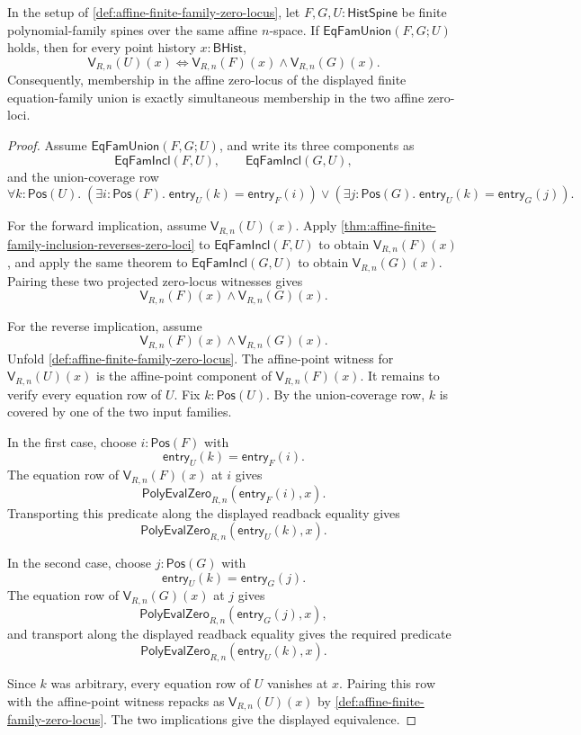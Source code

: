 \begin{theorem}
\label{thm:affine-zero-locus-union-is-intersection}
In the setup of \autoref{def:affine-finite-family-zero-locus}, let $F,G,U:\mathsf{HistSpine}$ be finite polynomial-family spines over the same affine $n$-space. If $\mathsf{EqFamUnion}(F,G;U)$ holds, then for every point history $x:\mathsf{BHist}$,
$$
\mathsf{V}_{R,n}(U)(x)
\Longleftrightarrow
\mathsf{V}_{R,n}(F)(x)\land\mathsf{V}_{R,n}(G)(x).
$$
Consequently, membership in the affine zero-locus of the displayed finite equation-family union is exactly simultaneous membership in the two affine zero-loci.
\end{theorem}
\begin{proof}
Assume $\mathsf{EqFamUnion}(F,G;U)$, and write its three components as
$$
\mathsf{EqFamIncl}(F,U),
\qquad
\mathsf{EqFamIncl}(G,U),
$$
and the union-coverage row
$$
\forall k:\mathsf{Pos}(U).\;
\left(\exists i:\mathsf{Pos}(F).\;
\mathsf{entry}_{U}(k)=\mathsf{entry}_{F}(i)\right)
\lor
\left(\exists j:\mathsf{Pos}(G).\;
\mathsf{entry}_{U}(k)=\mathsf{entry}_{G}(j)\right).
$$

For the forward implication, assume $\mathsf{V}_{R,n}(U)(x)$. Apply \autoref{thm:affine-finite-family-inclusion-reverses-zero-loci} to $\mathsf{EqFamIncl}(F,U)$ to obtain $\mathsf{V}_{R,n}(F)(x)$, and apply the same theorem to $\mathsf{EqFamIncl}(G,U)$ to obtain $\mathsf{V}_{R,n}(G)(x)$. Pairing these two projected zero-locus witnesses gives
$$
\mathsf{V}_{R,n}(F)(x)\land\mathsf{V}_{R,n}(G)(x).
$$

For the reverse implication, assume
$$
\mathsf{V}_{R,n}(F)(x)\land\mathsf{V}_{R,n}(G)(x).
$$
Unfold \autoref{def:affine-finite-family-zero-locus}. The affine-point witness for $\mathsf{V}_{R,n}(U)(x)$ is the affine-point component of $\mathsf{V}_{R,n}(F)(x)$. It remains to verify every equation row of $U$. Fix $k:\mathsf{Pos}(U)$. By the union-coverage row, $k$ is covered by one of the two input families.

In the first case, choose $i:\mathsf{Pos}(F)$ with
$$
\mathsf{entry}_{U}(k)=\mathsf{entry}_{F}(i).
$$
The equation row of $\mathsf{V}_{R,n}(F)(x)$ at $i$ gives
$$
\mathsf{PolyEvalZero}_{R,n}(\mathsf{entry}_{F}(i),x).
$$
Transporting this predicate along the displayed readback equality gives
$$
\mathsf{PolyEvalZero}_{R,n}(\mathsf{entry}_{U}(k),x).
$$

In the second case, choose $j:\mathsf{Pos}(G)$ with
$$
\mathsf{entry}_{U}(k)=\mathsf{entry}_{G}(j).
$$
The equation row of $\mathsf{V}_{R,n}(G)(x)$ at $j$ gives
$$
\mathsf{PolyEvalZero}_{R,n}(\mathsf{entry}_{G}(j),x),
$$
and transport along the displayed readback equality gives the required predicate
$$
\mathsf{PolyEvalZero}_{R,n}(\mathsf{entry}_{U}(k),x).
$$

Since $k$ was arbitrary, every equation row of $U$ vanishes at $x$. Pairing this row with the affine-point witness repacks as $\mathsf{V}_{R,n}(U)(x)$ by \autoref{def:affine-finite-family-zero-locus}. The two implications give the displayed equivalence.
\end{proof}

